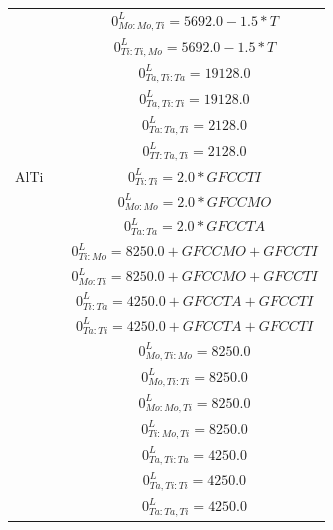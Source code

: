 \begin{longtable}[H]{ c c c }
                              & \cite{Ansara1998} & $0^\textit{L}_{Mo:Mo,Ti} = 5692.0-1.5*T$\\
                              & \cite{Ansara1998} & $0^\textit{L}_{Ti:Ti,Mo} = 5692.0-1.5*T$\\
                              & \cite{Ansara1998} & $0^\textit{L}_{Ta,Ti:Ta} = 19128.0$\\
                              & \cite{Ansara1998} & $0^\textit{L}_{Ta,Ti:Ti} = 19128.0$\\
                              & \cite{Ansara1998} & $0^\textit{L}_{Ta:Ta,Ti} = 2128.0$\\
                              & \cite{Ansara1998} & $0^\textit{L}_{TI:Ta,Ti} = 2128.0$\\
                       AlTi & \cite{Ansara1998} & $0^\textit{L}_{Ti:Ti} = 2.0*GFCCTI$\\
                              & \cite{Ansara1998} & $0^\textit{L}_{Mo:Mo} = 2.0*GFCCMO$\\
                              & \cite{Ansara1998} & $0^\textit{L}_{Ta:Ta} = 2.0*GFCCTA$\\
                              & \cite{Ansara1998} & $0^\textit{L}_{Ti:Mo} = 8250.0+GFCCMO+GFCCTI$\\
                              & \cite{Ansara1998} & $0^\textit{L}_{Mo:Ti} = 8250.0+GFCCMO+GFCCTI$\\
                              & \cite{Ansara1998} & $0^\textit{L}_{Ti:Ta} = 4250.0+GFCCTA+GFCCTI$\\
                              & \cite{Ansara1998} & $0^\textit{L}_{Ta:Ti} = 4250.0+GFCCTA+GFCCTI$\\
                              & \cite{Ansara1998} & $0^\textit{L}_{Mo,Ti:Mo} = 8250.0$\\
                              & \cite{Ansara1998} & $0^\textit{L}_{Mo,Ti:Ti} = 8250.0$\\
                        & \cite{Ansara1998} & $0^\textit{L}_{Mo:Mo,Ti} = 8250.0$\\
                        & \cite{Ansara1998} & $0^\textit{L}_{Ti:Mo,Ti} = 8250.0$\\
                        & \cite{Ansara1998} & $0^\textit{L}_{Ta,Ti:Ta} = 4250.0$\\
                        & \cite{Ansara1998} & $0^\textit{L}_{Ta,Ti:Ti} = 4250.0$\\
                        & \cite{Ansara1998} & $0^\textit{L}_{Ta:Ta,Ti} = 4250.0$\\

\end{longtable}
